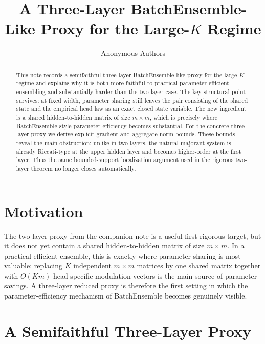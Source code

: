 \documentclass{article}
\title{A Three-Layer BatchEnsemble-Like Proxy for the Large-$K$ Regime}
\author{Anonymous Authors}
\theoremstyle{definition}
\begin{document}
\maketitle

\begin{abstract}
This note records a semifaithful three-layer BatchEnsemble-like proxy for the large-$K$ regime and explains why it is both more faithful to practical parameter-efficient ensembling and substantially harder than the two-layer case. The key structural point survives: at fixed width, parameter sharing still leaves the pair consisting of the shared state and the empirical head law as an exact closed state variable. The new ingredient is a shared hidden-to-hidden matrix of size $m\times m$, which is precisely where BatchEnsemble-style parameter efficiency becomes substantial. For the concrete three-layer proxy we derive explicit gradient and aggregate-norm bounds. These bounds reveal the main obstruction: unlike in two layers, the natural majorant system is already Riccati-type at the upper hidden layer and becomes higher-order at the first layer. Thus the same bounded-support localization argument used in the rigorous two-layer theorem no longer closes automatically.
\end{abstract}

\section{Motivation}

The two-layer proxy from the companion note is a useful first rigorous target, but it does not yet contain a shared hidden-to-hidden matrix of size $m\times m$. In a practical efficient ensemble, this is exactly where parameter sharing is most valuable: replacing $K$ independent $m\times m$ matrices by one shared matrix together with $O(Km)$ head-specific modulation vectors is the main source of parameter savings. A three-layer reduced proxy is therefore the first setting in which the parameter-efficiency mechanism of BatchEnsemble becomes genuinely visible.

\section{A Semifaithful Three-Layer Proxy}
\end{document}
